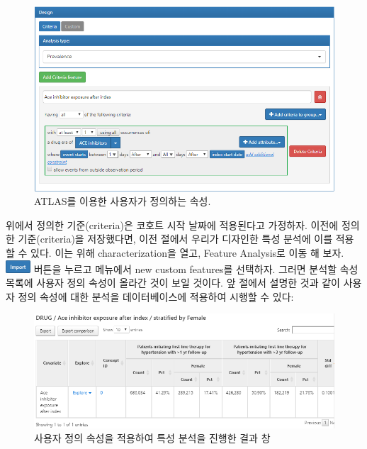 \documentclass[11pt]{book}
\theoremstyle{definition}
\theoremstyle{definition}
\theoremstyle{definition}
\theoremstyle{remark}
\begin{document}
\begin{figure}

{\centering \includegraphics[width=1\linewidth]{images/Characterization/atlasCharacterizationCustomFeature} 

}

\caption{ATLAS를 이용한 사용자가 정의하는 속성.}\label{fig:atlasCharacterizationCustomFeature}
\end{figure}

위에서 정의한 기준(criteria)은 코호트 시작 날짜에 적용된다고 가정하자.
이전에 정의한 기준(criteria)을 저장했다면, 이전 절에서 우리가 디자인한
특성 분석에 이를 적용할 수 있다. 이는 위해 characterization을 열고,
Feature Analysis로 이동 해 보자.
\includegraphics{images/Characterization/atlasImportButton.png} 버튼을
누르고 메뉴에서 new custom features를 선택하자. 그러면 분석할 속성
목록에 사용자 정의 속성이 올라간 것이 보일 것이다. 앞 절에서 설명한 것과
같이 사용자 정의 속성에 대한 분석을 데이터베이스에 적용하여 시행할 수
있다:

\begin{figure}

{\centering \includegraphics[width=1\linewidth]{images/Characterization/atlasCharacterizationCustomFeatureResults} 

}

\caption{사용자 정의 속성을 적용하여 특성 분석을 진행한 결과 창}\label{fig:atlasCharacterizationCustomFeatureResults}
\end{figure}
\end{document}
